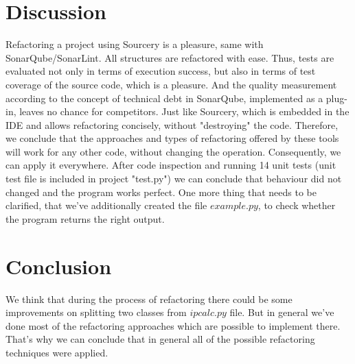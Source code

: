 \documentclass[unicode,11pt,a4paper,oneside,numbers=endperiod,openany]{scrartcl}
\begin{document}
\section{Discussion}
Refactoring a project using Sourcery is a pleasure, same with SonarQube/SonarLint. All structures are refactored with ease. Thus, tests are evaluated not only in terms of execution success, but also in terms of test coverage of the source code, which is a pleasure. And the quality measurement according to the concept of technical debt in SonarQube, implemented as a plug-in, leaves no chance for competitors. Just like Sourcery, which is embedded in the IDE and allows refactoring concisely, without "destroying" the code. Therefore, we conclude that the approaches and types of refactoring offered by these tools will work for any other code, without changing the operation. Consequently, we can apply it everywhere. After code inspection and running 14 unit tests (unit test file is included in project "test.py") we can conclude that behaviour did not changed and the program works perfect. 
\newline
One more thing that needs to be clarified, that we've additionally created the file $example.py$, to check whether the program returns the right output.

\section{Conclusion}

We think that during the process of refactoring there could be some improvements on splitting two classes from $ipcalc.py$ file. But in general we've done most of the refactoring approaches which are possible to implement there. That's why we can conclude that in general all of the possible refactoring techniques were applied.
\end{document}
